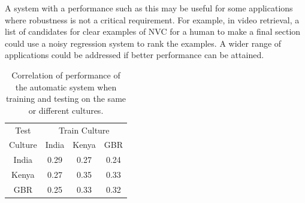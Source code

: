 
A system with a performance such as this may be useful for some applications where robustness is not a critical requirement. For example, in video retrieval, a list of candidates for clear examples of \ac{NVC} for a human to make a final section could use a noisy regression system to rank the examples. A wider range of applications could be addressed if better performance can be attained. 

\begin{table}
\centering
\caption{Correlation of performance of the automatic system when training and testing on the same or different cultures.}
\begin{tabular}{ | c | c  c  c | }
\hline
Test & \multicolumn{3}{c|}{Train Culture} \\
Culture & India & Kenya & GBR \\
\hline
\hline
India & \cellcolor[gray]{0.9}0.29 & 0.27 & 0.24\\
Kenya & 0.27 & \cellcolor[gray]{0.9}0.35 & 0.33 \\
GBR & 0.25 & 0.33 & \cellcolor[gray]{0.9}0.32 \\
\hline
\end{tabular}
\label{CrossCulturePerformanceTable}
\end{table}


